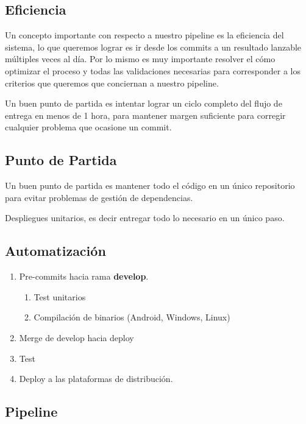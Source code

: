 \subsection{Eficiencia}\label{cdci:eficiencia}

Un concepto importante con respecto a nuestro pipeline es la eficiencia del
sistema, lo que queremos lograr es ir desde los commits a un resultado lanzable
múltiples veces al día. Por lo mismo es muy importante resolver el cómo
optimizar el proceso y todas las validaciones necesarias para corresponder a
los criterios que queremos que conciernan a nuestro pipeline.

Un buen punto de partida es intentar lograr un ciclo completo del flujo de entrega en menos de 1 hora, para mantener margen suficiente para corregir cualquier problema que ocasione un commit.

\subsection{Punto de Partida}\label{cdci:punto-de-partida}

Un buen punto de partida es mantener todo el código en un único repositorio para evitar problemas de gestión de dependencias.

Despliegues unitarios, es decir entregar todo lo necesario en un único paso.


\subsection{Automatización}\label{cdci:automatizacion}

\begin{enumerate}
  \item Pre-commits hacia rama \textbf{develop}.
  \begin{enumerate}
    \item Test unitarios
    \item Compilación de binarios (Android, Windows, Linux)
  \end{enumerate}
  \item Merge de develop hacia deploy
  \item Test
  \item Deploy a las plataformas de distribución.
\end{enumerate}

\subsection{Pipeline}

